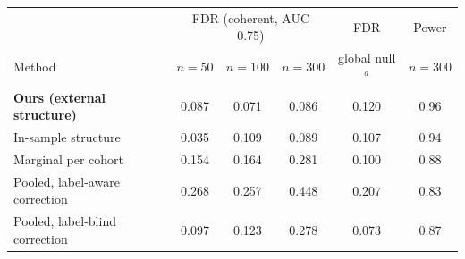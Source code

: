 \begin{tabular}{lccccc}
\toprule
 & \multicolumn{3}{c}{FDR (coherent, AUC 0.75)} & FDR & Power \\
Method & $n{=}50$ & $n{=}100$ & $n{=}300$ & global null$^a$ & $n{=}300$ \\
\midrule
\textbf{Ours (external structure)} & 0.087 & 0.071 & 0.086 & 0.120 & 0.96 \\
In-sample structure & 0.035 & 0.109 & 0.089 & 0.107 & 0.94 \\
Marginal per cohort & 0.154 & 0.164 & 0.281 & 0.100 & 0.88 \\
Pooled, label-aware correction & 0.268 & 0.257 & 0.448 & 0.207 & 0.83 \\
Pooled, label-blind correction & 0.097 & 0.123 & 0.278 & 0.073 & 0.87 \\
\bottomrule
\end{tabular}
